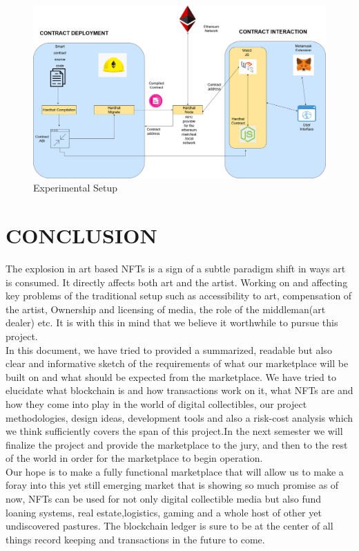 \documentclass[a4paper,12pt]{article}
\begin{document}
\begin{figure}[h]
\centering
\includegraphics[width=\textwidth]{Untitled Diagram.drawio(1)}
\caption{Experimental Setup}
\end{figure}












\section{CONCLUSION}
The explosion in art based NFTs is a sign of a subtle paradigm shift in ways art is consumed. It directly affects both art and the artist. Working on and affecting key problems of the traditional setup such as accessibility to art, compensation of the artist, Ownership and licensing of media, the role of the middleman(art dealer) etc. It is with this in mind that we believe it worthwhile to pursue this project.\\
In this document, we have tried to provided a summarized, readable but also clear and informative sketch of the requirements of what our marketplace will be built on and what should be expected from the marketplace. We have tried to elucidate what blockchain is and how transactions work on it, what NFTs are and how they come into play in the world of digital collectibles, our  project methodologies, design ideas, development tools and also a risk-cost analysis which we think sufficiently covers the span of this project.In the next semester we will finalize the project and provide the marketplace to the jury, and then to the rest of the world in order for the marketplace to begin operation.\\
Our hope is to make a fully functional marketplace that will allow us to make a foray into this yet still emerging market that is showing so much promise as of now, NFTs can be used for not only  digital collectible media but also fund loaning systems, real estate,logistics, gaming and a whole host of other yet undiscovered pastures. The blockchain ledger is sure to be at the center of all things record keeping and transactions in the future to come.  
\end{document}
